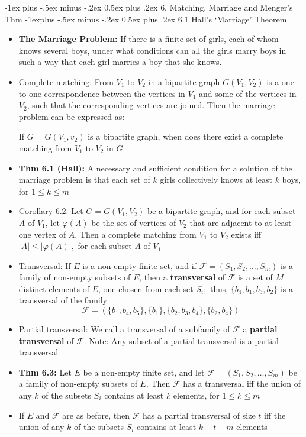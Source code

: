 \documentclass[10pt,landscape]{article}
\makeatletter
\renewcommand{\section}{\@startsection{section}{1}{0mm}%
                                {-1ex plus -.5ex minus -.2ex}%
                                {0.5ex plus .2ex}%
                                {\normalfont\large\bfseries}}
\renewcommand{\subsection}{\@startsection{subsection}{2}{0mm}%
                                {-1explus -.5ex minus -.2ex}%
                                {0.5ex plus .2ex}%
                                {\normalfont\normalsize\bfseries}}
\makeatother
\begin{document}
\begin{multicols}{2}
    \section{6. Matching, Marriage and Menger's Thm}
    \subsection{6.1 Hall's `Marriage' Theorem}
    \begin{itemize}
    \item \textbf{The Marriage Problem:} If there is a finite set of girls, each of whom knows several boys, under what conditions can all the girls marry boys in such a way that each girl marries a boy that she knows.
    \item Complete matching: From $V_1$ to $V_2$ in a bipartite graph $G(V_1, V_2)$ is a one-to-one correspondence between the vertices in $V_1$ and some of the vertices in $V_2$, such that the corresponding vertices are joined. Then the marriage problem can be expressed as: 

    If $G=G(V_1,v_2)$ is a bipartite graph, when does there exist a complete matching from $V_1$ to $V_2$ in $G$
    \item \textbf{Thm 6.1 (Hall):} A necessary and sufficient condition for a solution of the marriage problem is that each set of $k$ girls collectively knows at least $k$ boys, for $1\le k \le m$

    \item Corollary 6.2: Let $G=G(V_1,V_2)$ be a bipartite graph, and for each subset $A$ of $V_1$, let $\varphi(A)$ be the set of vertices of $V_2$ that are adjacent to at least one vertex of $A$. Then a complete matching from $V_1$ to $V_2$ exists iff $|A|\le |\varphi(A)|,$ for each subset $A$ of $V_1$

    \item Transversal: If $E$ is a non-empty finite set, and if $\mathcal{F}=(S_1, S_2,\dots, S_m)$ is a family of non-empty subsets of $E$, then a \textbf{transversal} of $\mathcal{F}$ is a set of $M$ distinct elements of $E$, one chosen from each set $S_i;$ thus, $\{b_4, b_1, b_3, b_2\}$ is a transversal of the family \\ $$\mathcal{F}=(\{b_1, b_4, b_5\}, \{b_1\}, \{b_2, b_3, b_4\}, \{b_2, b_4\})$$
    \item Partial transversal: We call a transversal of a subfamily of $\mathcal{F}$ a \textbf{partial transversal} of $\mathcal{F}$. Note: Any subset of a partial transversal is a partial transversal
    \item \textbf{Thm 6.3:} Let $E$ be a non-empty finite set, and let $\mathcal{F}= (S_1, S_2,\dots, S_m)$ be a family of non-empty subsets of $E$. Then $\mathcal{F}$ has a transversal iff the union of any $k$ of the subsets $S_i$ contains at least $k$ elements, for $1\le k\le m$
    \item If $E$ and $\mathcal{F}$ are as before, then $\mathcal{F}$ has a partial transversal of size $t$ iff the union of any $k$ of the subsets $S_i$ contains at least $k+t-m$ elements


\end{itemize}
\end{multicols}
\end{document}
